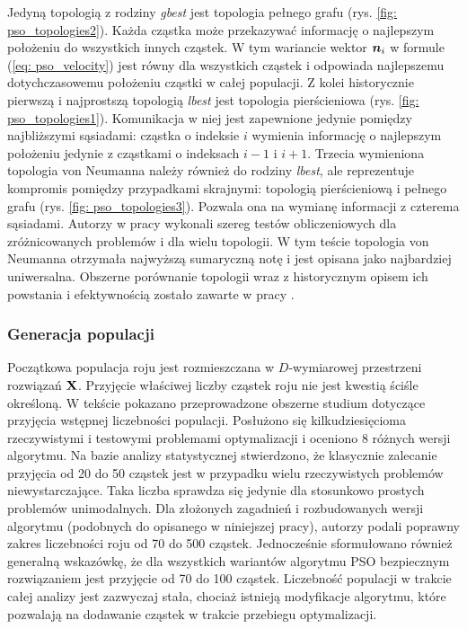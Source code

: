 Jedyną topologią z rodziny \textit{gbest} jest topologia pełnego grafu (rys. \ref{fig: pso_topologies2}). Każda cząstka może przekazywać informację o najlepszym położeniu do wszystkich innych cząstek. W tym wariancie wektor $\bm{n}_i$ w formule (\ref{eq: pso_velocity}) jest równy dla wszystkich cząstek i odpowiada najlepszemu dotychczasowemu położeniu cząstki w całej populacji. Z kolei historycznie pierwszą i najprostszą topologią \textit{lbest} jest topologia pierścieniowa (rys. \ref{fig: pso_topologies1}). Komunikacja w niej jest zapewnione jedynie pomiędzy najbliższymi sąsiadami: cząstka o indeksie $i$ wymienia informację o najlepszym położeniu jedynie z cząstkami o indeksach $i-1$ i $i+1$. Trzecia wymieniona topologia von Neumanna należy również do rodziny \textit{lbest}, ale reprezentuje kompromis pomiędzy przypadkami skrajnymi: topologią pierścieniową i pełnego grafu (rys. \ref{fig: pso_topologies3}). Pozwala ona na wymianę informacji z czterema sąsiadami. Autorzy w pracy \parencite{Kennedy2002} wykonali szereg testów obliczeniowych dla zróżnicowanych problemów i dla wielu topologii. W tym teście topologia von Neumanna otrzymała najwyższą sumaryczną notę i jest opisana jako najbardziej uniwersalna. Obszerne porównanie topologii wraz z historycznym opisem ich powstania i efektywnością zostało zawarte w pracy \parencite{Blackwell2019}.

\subsubsection{Generacja populacji}
Początkowa populacja roju jest rozmieszczana w $D$-wymiarowej przestrzeni rozwiązań $\mathbf{X}$. Przyjęcie właściwej liczby cząstek roju nie jest kwestią ściśle określoną. W tekście \cite{Piotrowski2020} pokazano przeprowadzone obszerne studium dotyczące przyjęcia wstępnej liczebności populacji. Posłużono się kilkudziesięcioma rzeczywistymi i testowymi problemami optymalizacji i oceniono 8 różnych wersji algorytmu. Na bazie analizy statystycznej stwierdzono, że klasycznie zalecanie przyjęcia od 20 do 50 cząstek \parencite{Liang2006,Chen2012,Harrison2018} jest w przypadku wielu rzeczywistych problemów niewystarczające. Taka liczba sprawdza się jedynie dla stosunkowo prostych problemów unimodalnych. Dla złożonych zagadnień i rozbudowanych wersji algorytmu (podobnych do opisanego w niniejszej pracy), autorzy podali poprawny zakres liczebności roju od 70 do 500 cząstek. Jednocześnie sformułowano również generalną wskazówkę, że dla wszystkich wariantów algorytmu PSO bezpiecznym rozwiązaniem jest przyjęcie od 70 do 100 cząstek. Liczebność populacji w trakcie całej analizy jest zazwyczaj stała, chociaż istnieją modyfikacje algorytmu, które pozwalają na dodawanie cząstek w trakcie przebiegu optymalizacji.

